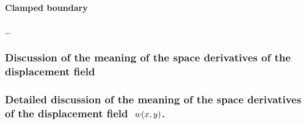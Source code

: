 \documentclass[letterpaper,10pt,english]{jupyterBook}
\begin{document}
\paragraph{Clamped boundary}
\label{\detokenize{ch/solids/plates-shells/kirchhoff:clamped-boundary}}
\sphinxAtStartPar
…




\subsubsection{Discussion of the meaning of the space derivatives of the displacement field}
\label{\detokenize{ch/solids/plates-shells/kirchhoff:discussion-of-the-meaning-of-the-space-derivatives-of-the-displacement-field}}\label{\detokenize{ch/solids/plates-shells/kirchhoff:solid-mechanics-small-displacements-plates-shells-kirchhoff-pure-bending-discussion}}\subsubsection*{Detailed discussion of the meaning of the space derivatives of the displacement field \protect\(\ w(x,y)\protect\).}
\end{document}
